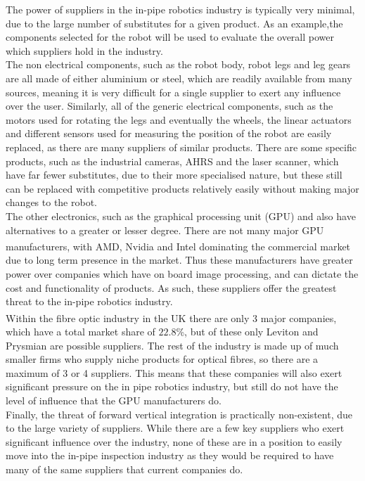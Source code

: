 \documentclass[11pt]{article}		%
\begin{document}
			The power of suppliers in the in-pipe robotics industry is typically very minimal, due to the large number of substitutes for a given product.
			As an example,the components selected for the robot will be used to evaluate the overall power which suppliers hold in the industry.
			\\
			The non electrical components, such as the robot body, robot legs and leg gears are all made of either aluminium or steel, which are readily available from many sources, meaning it is very difficult for a single supplier to exert any influence over the user.
			Similarly, all of the generic electrical components, such as the motors used for rotating the legs and eventually the wheels, the linear actuators and different sensors used for measuring the position of the robot are easily replaced, as there are many suppliers of similar products.
			There are some specific products, such as the industrial cameras, AHRS and the laser scanner, which have far fewer substitutes, due to their more specialised nature, but these still can be replaced with competitive products relatively easily without making major changes to the robot.
			\\
			The other electronics, such as the graphical processing unit (GPU) and  also have alternatives to a greater or lesser degree.
			There are not many major GPU manufacturers, with AMD, Nvidia and Intel dominating the commercial market\textsuperscript{\cite{rake2020graphic}} due to long term presence in the market.
			Thus these manufacturers have greater power over companies which have on board image processing, and can dictate the cost and functionality of  products.
			As such, these suppliers offer the greatest threat to the in-pipe robotics industry.
			\\
			Within the fibre optic industry in the UK there are only 3 major companies\textsuperscript{\cite{neve2020fibreoptic}}, which have a total market share of $22.8$\%, but of these only Leviton and Prysmian are possible suppliers.
			The rest of the industry is made up of much smaller firms who supply niche products for optical fibres, so there are a maximum of 3 or 4 suppliers.
			This means that these companies will also exert significant pressure on the in pipe robotics industry, but still do not have the level of influence that the GPU manufacturers do.
			\\
			Finally, the threat of forward vertical integration is practically non-existent, due to the large variety of suppliers.
			While there are a few key suppliers who exert significant influence over the industry, none of these are in a position to easily move into the in-pipe inspection industry as they would be required to have many of the same suppliers that current companies do.
					
\end{document}
